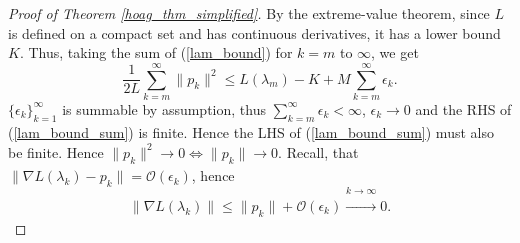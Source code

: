 \documentclass[11pt, twoside]{report}
\begin{document}
\begin{proof}[Proof of Theorem \ref{hoag_thm_simplified}]
By the extreme-value theorem, since $L$ is defined on a compact set and has continuous derivatives, it has a lower bound $K$. Thus, taking the sum of (\ref{lam_bound}) for $k = m$ to $\infty$, we get
\begin{equation} \label{lam_bound_sum}
   \frac{1}{2L}\sum_{k=m}^\infty \|p_k\|^2 \leq L(\lambda_m) - K + M\sum_{k=m}^\infty \epsilon_k.
\end{equation}
$\{\epsilon_k\}_{k=1}^\infty$ is summable by assumption, thus $\sum_{k=m}^\infty \epsilon_k < \infty$, $\epsilon_k \xrightarrow[]{} 0$ and the RHS of (\ref{lam_bound_sum}) is finite. Hence the LHS of (\ref{lam_bound_sum}) must also be finite. Hence $\|p_k\|^2 \xrightarrow[]{} 0 \iff \|p_k\| \xrightarrow[]{} 0.$ Recall, that $\|\nabla L(\lambda_k) - p_k\| = \mathcal{O}(\epsilon_k)$, hence 
\[\|\nabla L(\lambda_k)\| \leq \|p_k\| + \mathcal{O}(\epsilon_k) \xrightarrow[]{k \xrightarrow[]{} \infty} 0.\]

\end{proof}
\end{document}
